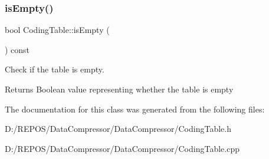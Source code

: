 \subsubsection{\texorpdfstring{isEmpty()}{isEmpty()}}
{\footnotesize\ttfamily bool Coding\+Table\+::is\+Empty (\begin{DoxyParamCaption}{ }\end{DoxyParamCaption}) const}



Check if the table is empty. 

\begin{DoxyReturn}{Returns}
Boolean value representing whether the table is empty 
\end{DoxyReturn}


The documentation for this class was generated from the following files\+:\begin{DoxyCompactItemize}
\item 
D\+:/\+R\+E\+P\+O\+S/\+Data\+Compressor/\+Data\+Compressor/Coding\+Table.\+h\item 
D\+:/\+R\+E\+P\+O\+S/\+Data\+Compressor/\+Data\+Compressor/Coding\+Table.\+cpp\end{DoxyCompactItemize}
